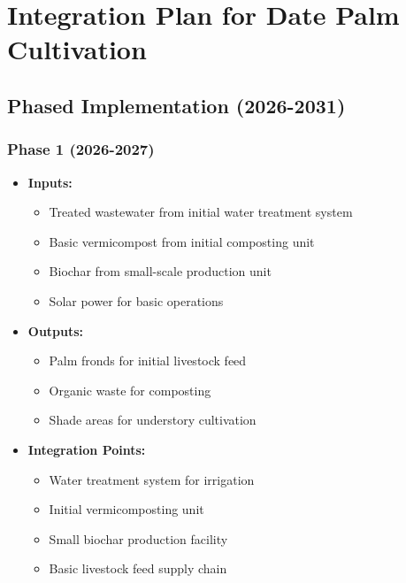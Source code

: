 \section{Integration Plan for Date Palm Cultivation}

\subsection{Phased Implementation (2026-2031)}

\subsubsection{Phase 1 (2026-2027)}
\begin{itemize}
    \item \textbf{Inputs:}
    \begin{itemize}
        \item Treated wastewater from initial water treatment system
        \item Basic vermicompost from initial composting unit
        \item Biochar from small-scale production unit
        \item Solar power for basic operations
    \end{itemize}
    \item \textbf{Outputs:}
    \begin{itemize}
        \item Palm fronds for initial livestock feed
        \item Organic waste for composting
        \item Shade areas for understory cultivation
    \end{itemize}
    \item \textbf{Integration Points:}
    \begin{itemize}
        \item Water treatment system for irrigation
        \item Initial vermicomposting unit
        \item Small biochar production facility
        \item Basic livestock feed supply chain
    \end{itemize}
\end{itemize}


